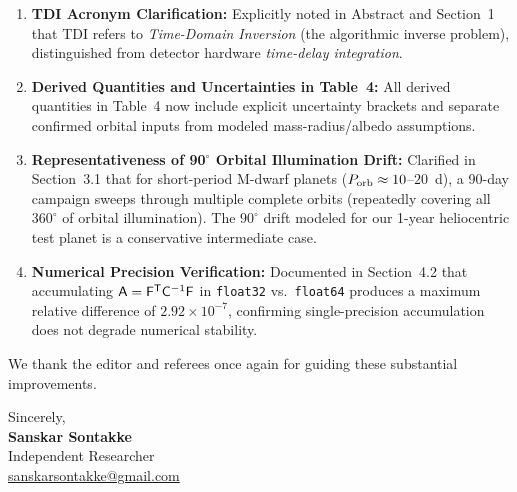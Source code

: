 \documentclass[11pt]{article}
\begin{document}
\begin{enumerate}
\item \textbf{TDI Acronym Clarification:} Explicitly noted in Abstract and Section~1 that TDI refers to \textit{Time-Domain Inversion} (the algorithmic inverse problem), distinguished from detector hardware \textit{time-delay integration}.
\item \textbf{Derived Quantities and Uncertainties in Table~4:} All derived quantities in Table~4 now include explicit uncertainty brackets and separate confirmed orbital inputs from modeled mass-radius/albedo assumptions.
\item \textbf{Representativeness of 90$^\circ$ Orbital Illumination Drift:} Clarified in Section~3.1 that for short-period M-dwarf planets ($P_{\rm orb} \approx 10$--$20$~d), a 90-day campaign sweeps through multiple complete orbits (repeatedly covering all $360^\circ$ of orbital illumination). The $90^\circ$ drift modeled for our 1-year heliocentric test planet is a conservative intermediate case.
\item \textbf{Numerical Precision Verification:} Documented in Section~4.2 that accumulating $\mathsf{A} = \mathsf{F}^{\sf T}\mathsf{C}^{-1}\mathsf{F}$ in \texttt{float32} vs.\ \texttt{float64} produces a maximum relative difference of $2.92 \times 10^{-7}$, confirming single-precision accumulation does not degrade numerical stability.
\end{enumerate}

\vspace{4mm}
We thank the editor and referees once again for guiding these substantial improvements.

\vspace{4mm}
Sincerely,\\[2mm]
\textbf{Sanskar Sontakke}\\
Independent Researcher\\
\href{mailto:sanskarsontakke@gmail.com}{sanskarsontakke@gmail.com}
\end{document}
